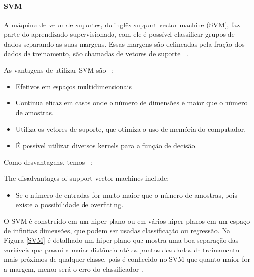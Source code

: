       \paragraph{SVM}
      \label{par:svm}

        A máquina de vetor de suportes, do inglês support vector machine (\acrshort{SVM}), faz parte do aprendizado supervisionado, com ele é possível
        classificar grupos de dados separando as suas margens. Essas margens são delineadas pela fração dos dados de treinamento, são chamadas de vetores de suporte ~\cite{chang2011libsvm}.

        As vantagens de utilizar \acrshort{SVM} são ~\cite{pedregosa2011scikit}:

        \begin{itemize}

          \item Efetivos em espaços multidimensionais
          \item Continua eficaz em casos onde o número de dimensões é maior que o número de amostras.
          \item Utiliza os vetores de suporte, que otimiza o uso de memória do computador.
          \item É possível utilizar diversos kernels para a função de decisão.

        \end{itemize}

        Como desvantagens, temos ~\cite{pedregosa2011scikit}:

        The disadvantages of support vector machines include:

        \begin{itemize}

          \item Se o número de entradas for muito maior que o número de amostras, pois existe a possibilidade de overfitting.

        \end{itemize}
        
        O \acrshort{SVM} é construido em um hiper-plano ou em vários hiper-planos em um espaço de infinitas dimensões, que podem ser
        usadas classificação ou regressão. Na Figura \ref{SVM} é detalhado um hiper-plano que mostra uma boa separação das variáveis
        que possui a maior distância até os pontos dos dados de treinamento mais próximos de qualquer classe, pois é conhecido no \acrshort{SVM}
        que quanto maior for a margem, menor será o erro do classificador~\cite{vieira2017plantrna_sniffer}. 
        
